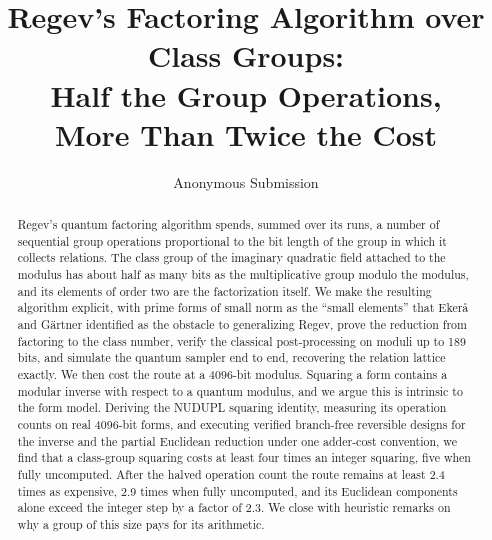 \documentclass[runningheads]{llncs}
\begin{document}
\title{Regev's Factoring Algorithm over Class Groups:\\ Half the Group Operations,\\ More Than Twice the Cost}
\author{Anonymous Submission}
\institute{}
\maketitle

\begin{abstract}
Regev's quantum factoring algorithm spends, summed over its runs, a number of sequential group operations proportional to the bit length of the group in which it collects relations. The class group of the imaginary quadratic field attached to the modulus has about half as many bits as the multiplicative group modulo the modulus, and its elements of order two are the factorization itself. We make the resulting algorithm explicit, with prime forms of small norm as the ``small elements'' that Eker\aa{} and G\"artner identified as the obstacle to generalizing Regev, prove the reduction from factoring to the class number, verify the classical post-processing on moduli up to 189 bits, and simulate the quantum sampler end to end, recovering the relation lattice exactly. We then cost the route at a 4096-bit modulus. Squaring a form contains a modular inverse with respect to a quantum modulus, and we argue this is intrinsic to the form model. Deriving the NUDUPL squaring identity, measuring its operation counts on real 4096-bit forms, and executing verified branch-free reversible designs for the inverse and the partial Euclidean reduction under one adder-cost convention, we find that a class-group squaring costs at least four times an integer squaring, five when fully uncomputed. After the halved operation count the route remains at least 2.4 times as expensive, 2.9 times when fully uncomputed, and its Euclidean components alone exceed the integer step by a factor of 2.3. We close with heuristic remarks on why a group of this size pays for its arithmetic.
\end{abstract}
\end{document}
